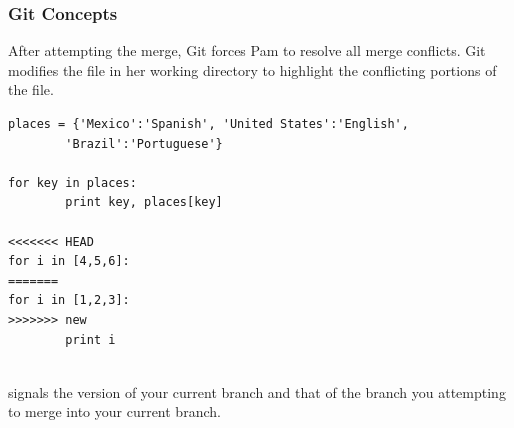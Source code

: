 \begin{frame}[fragile]\frametitle{Git Concepts}
    After attempting the merge, Git forces Pam to resolve
    all merge conflicts. Git modifies the file in her working
    directory to highlight the conflicting portions of the file.

    \vspace{0.5cm}
    \newbox{\mybox}
    \begin{lrbox}{\mybox}
    \begin{minipage}{\linewidth}
    \begin{lstlisting}[basicstyle=\tiny\ttfamily\color{white}]
places = {'Mexico':'Spanish', 'United States':'English',
        'Brazil':'Portuguese'}

for key in places:
        print key, places[key]

<<<<<<< HEAD
for i in [4,5,6]:
=======
for i in [1,2,3]:
>>>>>>> new
        print i
    
    \end{lstlisting}
    \end{minipage}
    \end{lrbox}
    \colorbox{black}{\usebox{\mybox}}

    \vspace{0.5cm}
     signals the version of your current branch
    and  that of the branch you attempting to 
    merge into your current branch. 
\end{frame}

